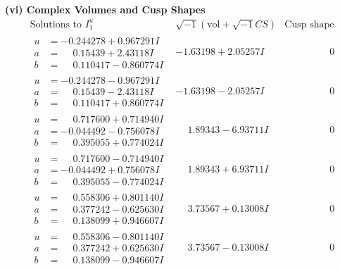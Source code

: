 \documentclass[1p]{elsarticle_modified}
\theoremstyle{definition}
\newcommand{\I}{\sqrt{-1}}
\begin{document}
\newpage\flushleft \textbf{(vi) Complex Volumes and Cusp Shapes}
$$\begin{array}{c|c|c}  
\text{Solutions to }I^u_{1}& \I (\text{vol} + \sqrt{-1}CS) & \text{Cusp shape}\\
 \hline 
\begin{aligned}
u &= -0.244278 + 0.967291 I \\
a &= \phantom{-}0.15439 + 2.43118 I \\
b &= \phantom{-}0.110417 - 0.860774 I\end{aligned}
 & -1.63198 + 2.05257 I & \phantom{-0.000000 } 0 \\ \hline\begin{aligned}
u &= -0.244278 - 0.967291 I \\
a &= \phantom{-}0.15439 - 2.43118 I \\
b &= \phantom{-}0.110417 + 0.860774 I\end{aligned}
 & -1.63198 - 2.05257 I & \phantom{-0.000000 } 0 \\ \hline\begin{aligned}
u &= \phantom{-}0.717600 + 0.714940 I \\
a &= -0.044492 - 0.756078 I \\
b &= \phantom{-}0.395055 + 0.774024 I\end{aligned}
 & \phantom{-}1.89343 - 6.93711 I & \phantom{-0.000000 } 0 \\ \hline\begin{aligned}
u &= \phantom{-}0.717600 - 0.714940 I \\
a &= -0.044492 + 0.756078 I \\
b &= \phantom{-}0.395055 - 0.774024 I\end{aligned}
 & \phantom{-}1.89343 + 6.93711 I & \phantom{-0.000000 } 0 \\ \hline\begin{aligned}
u &= \phantom{-}0.558306 + 0.801140 I \\
a &= \phantom{-}0.377242 - 0.625630 I \\
b &= \phantom{-}0.138099 + 0.946607 I\end{aligned}
 & \phantom{-}3.73567 + 0.13008 I & \phantom{-0.000000 } 0 \\ \hline\begin{aligned}
u &= \phantom{-}0.558306 - 0.801140 I \\
a &= \phantom{-}0.377242 + 0.625630 I \\
b &= \phantom{-}0.138099 - 0.946607 I\end{aligned}
 & \phantom{-}3.73567 - 0.13008 I & \phantom{-0.000000 } 0 \\ \hline\begin{aligned}

\end{aligned}
\end{array}$$
\end{document}
